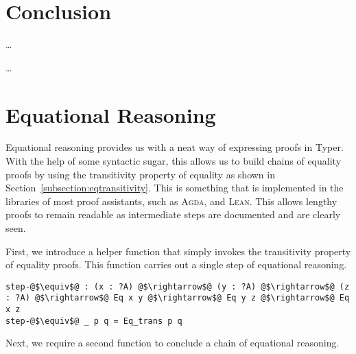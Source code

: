 \documentclass[12pt,twoside,maitrise]{dms}
\theoremstyle{definition}
\numberwithin{equation}{section}
\numberwithin{table}{chapter}
\numberwithin{figure}{chapter}
\def\Agda{\textsc{Agda}\xspace}
\def\Lean{\textsc{Lean}\xspace}
\begin{document}
\chapter{Conclusion}

\ldots


\ldots





\def\bibname{References}






\anglais
\appendix

\chapter{Equational Reasoning}\label{section:eqreasoning}
Equational reasoning provides us with a neat way of expressing proofs in Typer.
With the help of some syntactic sugar, this allows us to build chains of
equality proofs by using the transitivity property of equality as shown in
Section~\ref{subsection:eqtransitivity}. This is something that is implemented
in the libraries of most proof assistants, such as \Agda{}, and \Lean{}. This
allows lengthy proofs to remain readable as intermediate steps are documented
and are clearly seen.

First, we introduce a helper function that simply invokes the transitivity
property of equality proofs. This function carries out a single step of
equational reasoning.

\begin{verbatim}
step-@$\equiv$@ : (x : ?A) @$\rightarrow$@ (y : ?A) @$\rightarrow$@ (z : ?A) @$\rightarrow$@ Eq x y @$\rightarrow$@ Eq y z @$\rightarrow$@ Eq x z
step-@$\equiv$@ _ p q = Eq_trans p q
\end{verbatim}

Next, we require a second function to conclude a chain of equational reasoning.
\end{document}
